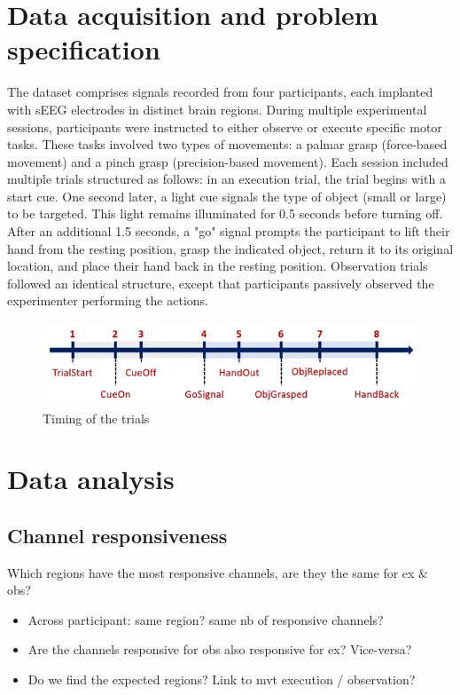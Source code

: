 \documentclass[10pt,conference,compsocconf]{IEEEtran}
\begin{document}
\section{Data acquisition and problem specification}
\label{sec:problem}
The dataset comprises signals recorded from four participants, each implanted with sEEG electrodes in distinct brain regions. During multiple experimental sessions, participants were instructed to either observe or execute specific motor tasks. These tasks involved two types of movements: a palmar grasp (force-based movement) and a pinch grasp (precision-based movement). Each session included multiple trials structured as follows: in an execution trial, the trial begins with a start cue. One second later, a light cue signals the type of object (small or large) to be targeted. This light remains illuminated for 0.5 seconds before turning off. After an additional 1.5 seconds, a "go" signal prompts the participant to lift their hand from the resting position, grasp the indicated object, return it to its original location, and place their hand back in the resting position. Observation trials followed an identical structure, except that participants passively observed the experimenter performing the actions.

\begin{figure}[h!]
  \center
  \includegraphics[width=\linewidth]{images/2024-12-11-13-41-48.png}
  \caption{Timing of the trials}
\end{figure}
\FloatBarrier

\section{Data analysis}
\label{sec:analysis}

\subsection{Channel responsiveness}
Which regions have the most responsive channels, are they the same for ex \& obs?

\begin{itemize}
    \item Across participant: same region? same nb of responsive channels?
    \item Are the channels responsive for obs also responsive for ex? Vice-versa?
    \item Do we find the expected regions? Link to mvt execution / observation?
\end{itemize}
\end{document}
